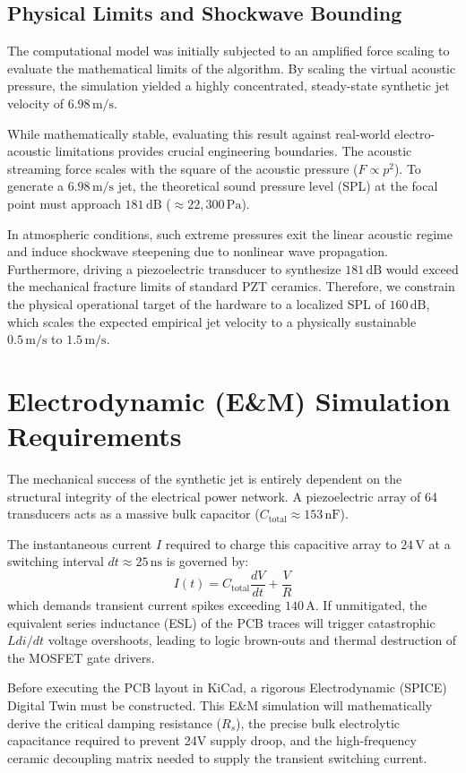 \documentclass[journal, 10pt]{IEEEtran}
\begin{document}
\subsection{Physical Limits and Shockwave Bounding}
The computational model was initially subjected to an amplified force scaling to evaluate the mathematical limits of the algorithm. By scaling the virtual acoustic pressure, the simulation yielded a highly concentrated, steady-state synthetic jet velocity of $6.98\,\text{m/s}$. 

While mathematically stable, evaluating this result against real-world electro-acoustic limitations provides crucial engineering boundaries. The acoustic streaming force scales with the square of the acoustic pressure ($F \propto p^2$). To generate a $6.98\,\text{m/s}$ jet, the theoretical sound pressure level (SPL) at the focal point must approach $181\,\text{dB}$ ($\approx 22,300\,\text{Pa}$). 

In atmospheric conditions, such extreme pressures exit the linear acoustic regime and induce shockwave steepening due to nonlinear wave propagation. Furthermore, driving a piezoelectric transducer to synthesize $181\,\text{dB}$ would exceed the mechanical fracture limits of standard PZT ceramics. Therefore, we constrain the physical operational target of the hardware to a localized SPL of $160\,\text{dB}$, which scales the expected empirical jet velocity to a physically sustainable $0.5\,\text{m/s}$ to $1.5\,\text{m/s}$.

\section{Electrodynamic (E\&M) Simulation Requirements}
The mechanical success of the synthetic jet is entirely dependent on the structural integrity of the electrical power network. A piezoelectric array of 64 transducers acts as a massive bulk capacitor ($C_{\text{total}} \approx 153\,\text{nF}$). 

The instantaneous current $I$ required to charge this capacitive array to $24\,\text{V}$ at a switching interval $dt \approx 25\,\text{ns}$ is governed by:
\begin{equation}
    I(t) = C_{\text{total}} \frac{dV}{dt} + \frac{V}{R}
\end{equation}
which demands transient current spikes exceeding $140\,\text{A}$. If unmitigated, the equivalent series inductance (ESL) of the PCB traces will trigger catastrophic $Ldi/dt$ voltage overshoots, leading to logic brown-outs and thermal destruction of the MOSFET gate drivers.

Before executing the PCB layout in KiCad, a rigorous Electrodynamic (SPICE) Digital Twin must be constructed. This E\&M simulation will mathematically derive the critical damping resistance ($R_s$), the precise bulk electrolytic capacitance required to prevent 24V supply droop, and the high-frequency ceramic decoupling matrix needed to supply the transient switching current.
\end{document}
